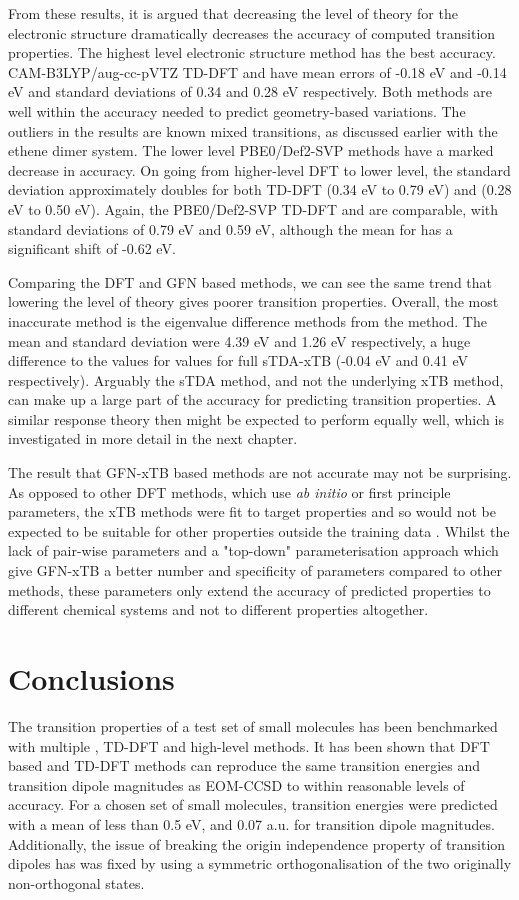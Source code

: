 From these results, it is argued that decreasing the level of theory for the electronic
structure dramatically decreases the accuracy of computed transition properties.
The highest level electronic structure method has the best accuracy. CAM-B3LYP/aug-cc-pVTZ 
TD-DFT and \dscf have mean errors of -0.18 eV and -0.14 eV and standard deviations 
of 0.34 and 0.28 eV respectively. Both methods are well within the accuracy needed 
to predict geometry-based variations. The outliers in the \dscf results are known
mixed transitions, as discussed earlier with the ethene dimer system. The lower 
level PBE0/Def2-SVP methods have a marked decrease in accuracy. On going from higher-level
DFT to lower level, the standard deviation approximately doubles for both TD-DFT 
(0.34 eV to 0.79 eV) and \dscf (0.28 eV to 0.50 eV). Again, the PBE0/Def2-SVP TD-DFT
and \dscf are comparable, with standard deviations of 0.79 eV and 0.59 eV, although
the mean for \dscf has a significant shift of -0.62 eV. 

Comparing the DFT and GFN based methods, we can see the same trend that lowering
the level of theory gives poorer transition properties. Overall, the most inaccurate
method is the eigenvalue difference methods from the  method. The
mean and standard deviation were 4.39 eV and 1.26 eV respectively, a huge difference 
to the values for values for full sTDA-xTB (-0.04 eV and 0.41 eV respectively)\cite{Grimme2016}. 
Arguably the sTDA method, and not the underlying xTB method, can make up a large
part of the accuracy for predicting transition properties. A similar response theory
then might be expected to perform equally well, which is investigated in more detail
in the next chapter.

The result that GFN-xTB based methods are not accurate may not be surprising. As 
opposed to other DFT methods, which use \emph{ab initio} or first principle parameters, 
the xTB methods were fit to target properties and so would not be expected to be
suitable for other properties outside the training data \cite{Bannwarth2020}. Whilst
the lack of pair-wise parameters and a "top-down" parameterisation approach which give
GFN-xTB a better number and specificity of parameters compared to other methods, 
these parameters only extend the accuracy of predicted properties to different
chemical systems and not to different properties altogether.

\section{Conclusions}
\label{sec:dxtb_conclusions}
The transition properties of a test set of small molecules has been benchmarked 
with multiple \dscf, TD-DFT and high-level methods. It has been shown that DFT 
based \dscf and TD-DFT methods can reproduce the same transition energies and transition
dipole magnitudes as EOM-CCSD to within reasonable levels of accuracy. For a chosen
set of small molecules, transition energies were predicted with a mean of less than
0.5 eV, and 0.07 a.u. for transition dipole magnitudes. Additionally, the issue of
breaking the origin independence property of transition dipoles has was fixed by using
a symmetric orthogonalisation of the two originally non-orthogonal states.

